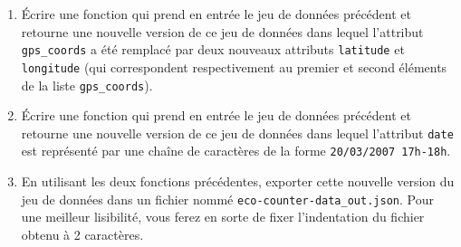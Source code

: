 \documentclass[11pt,a4paper]{article}
\begin{document}
\begin{enumerate}
    \item Écrire une fonction qui prend en entrée le jeu de données précédent et retourne une nouvelle version de ce jeu de données dans lequel l'attribut \verb+gps_coords+ a été remplacé par deux nouveaux attributs \verb+latitude+ et \verb+longitude+ (qui correspondent respectivement au premier et second éléments de la liste \verb+gps_coords+).
    
    \item Écrire une fonction qui prend en entrée le jeu de données précédent et retourne une nouvelle version de ce jeu de données dans lequel l'attribut \verb+date+ est représenté par une chaîne de caractères de la forme \verb+20/03/2007 17h-18h+.
    
    \item En utilisant les deux fonctions précédentes, exporter cette nouvelle version du jeu de données dans un fichier nommé \verb+eco-counter-data_out.json+. Pour une meilleur lisibilité, vous ferez en sorte de fixer l'indentation du fichier obtenu à 2 caractères.
\end{enumerate}
\end{document}
